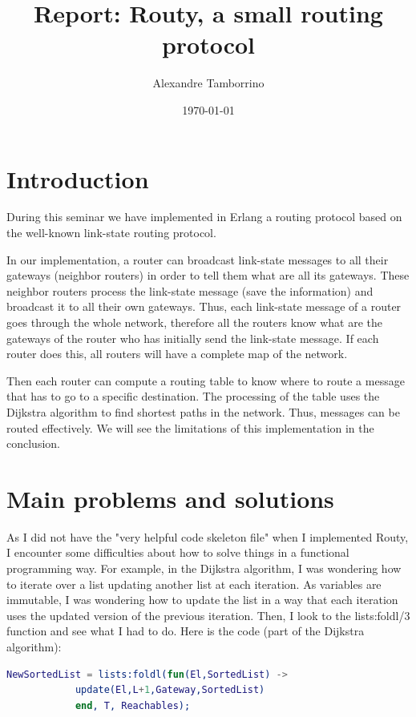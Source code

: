 \documentclass[a4paper, 11pt]{article}
\title{Report: Routy, a small routing protocol}
\author{Alexandre Tamborrino}
\date{\today{}}
\begin{document}
\maketitle

\section{Introduction}

During this seminar we have implemented in Erlang a routing protocol based on the well-known link-state routing protocol.

In our implementation, a router can broadcast link-state messages to all their gateways (neighbor routers) in order to tell them what are all its gateways. These neighbor routers process the link-state message (save the information) and broadcast it to all their own gateways. Thus, each link-state message of a router goes through the whole network, therefore all the routers know what are the gateways of the router who has initially send the link-state message. If each router does this, all routers will have a complete map of the network.

Then each router can compute a routing table to know where to route a message that has to go to a specific destination. The processing of the table uses the Dijkstra algorithm to find shortest paths in the network. Thus, messages can be routed effectively. We will see the limitations of this implementation in the conclusion.

\section{Main problems and solutions}

As I did not have the "very helpful code skeleton file" when I implemented Routy, I encounter some difficulties about how to solve things in a functional programming way.
For example, in the Dijkstra algorithm, I was wondering how to iterate over a list updating another list at each iteration. As variables are immutable, I was wondering how to update the list in a way that each iteration uses the updated version of the previous iteration. Then, I look to the lists:foldl/3 function and see what I had to do. Here is the code (part of the Dijkstra algorithm):
\begin{lstlisting}[language=erlang]
NewSortedList = lists:foldl(fun(El,SortedList) ->
		    update(El,L+1,Gateway,SortedList)
		    end, T, Reachables);
\end{lstlisting}
\end{document}
